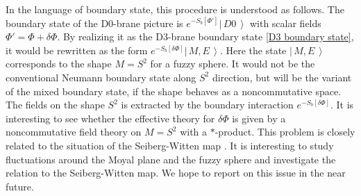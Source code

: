 \documentclass[12pt]{article}
\numberwithin{equation}{section}
\newcommand{\rc}[1]{\textcolor{red}{#1}}
\newcommand{\Ket}[1]{\left|\, #1\,\right\rangle}
\def\real{\mathbb{R}}
\begin{document}
In the language of boundary state, this procedure is understood as follows.
The boundary state of the D0-brane picture is $e^{-S_b[\Phi']}\Ket{D0}$ 
with scalar fields $\Phi'=\Phi+\delta\Phi$. %
By realizing it as the D3-brane boundary state \eqref{D3 boundary state}, 
it would be rewritten as the form $e^{-S_b[\delta \Phi]}\Ket{M,E}$.
Here the state $\Ket{M,E}$ corresponds to the shape $M=S^2$ for a fuzzy sphere.
It would not be the conventional Neumann boundary state along $S^2$ direction,
but will be the variant of the mixed boundary state, if the shape behaves as 
a noncommutative space. 
The fields on the shape $S^2$ is 
extracted by the boundary interaction $e^{-S_b[\delta \Phi]}$.
It is interesting to see whether the effective theory for $\delta \Phi$ is given by a noncommutative field theory on $M=S^2$ with a $*$-product.
This problem is closely related to the situation of the Seiberg-Witten map \cite{Seiberg1999}.
It is interesting to study fluctuations around the Moyal plane and the fuzzy sphere 
and investigate the relation to the Seiberg-Witten map.
We hope to report on this issue in the near future.

%
\end{document}
